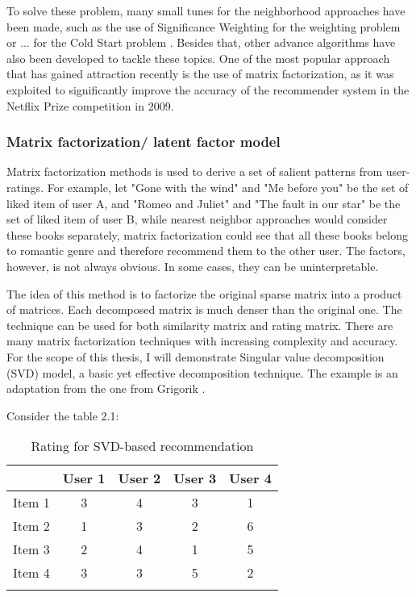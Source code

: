 To solve these problem, many small tunes for the neighborhood approaches have been made, such as the use of Significance Weighting \cite{} for the weighting problem or ... for the Cold Start problem \cite{}. Besides that, other advance algorithms have also been developed to tackle these topics. One of the most popular approach that has gained attraction recently is the use of matrix factorization, as it was exploited to significantly improve the accuracy of the recommender system in the Netflix Prize competition in 2009.

\subsubsection{Matrix factorization/ latent factor model}
Matrix factorization methods is used to derive a set of salient patterns from user-ratings. For example, let "Gone with the wind" and "Me before you" be the set of liked item of user A, and "Romeo and Juliet" and "The fault in our star" be the set of liked item of user B, while nearest neighbor approaches would consider these books separately, matrix factorization could see that all these books belong to romantic genre and therefore recommend them to the other user. The factors, however, is not always obvious. In some cases, they can be uninterpretable.

The idea of this method is to factorize the original sparse matrix into a product of matrices. Each decomposed matrix is much denser than the original one. The technique can be used for both similarity matrix and rating matrix. There are many matrix factorization techniques with increasing complexity and accuracy. For the scope of this thesis, I will demonstrate Singular value decomposition (SVD) model, a basic yet effective decomposition technique. The example is an adaptation from the one from Grigorik \cite{I. Grigorik}. 

Consider the table 2.1:

\begin{table}
\centering
\begin{tabular}{c c c c c}
\hline\hline
& User 1 & User 2 & User 3 & User 4 \\
\hline
Item 1 & 3 & 4 & 3 & 1 \\
Item 2 & 1 & 3 & 2 & 6 \\
Item 3 & 2 & 4 & 1 & 5 \\
Item 4 & 3 & 3 & 5 & 2 \\

\hline\hline \\
\end{tabular}
\caption{Rating for SVD-based recommendation}
\label{table:1}
\end{table}

